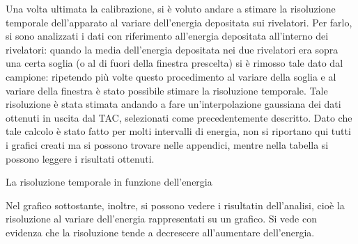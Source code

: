 
Una volta ultimata la calibrazione, si è voluto andare a stimare la risoluzione temporale dell'apparato al variare dell'energia depositata sui
rivelatori. Per farlo, si sono analizzati i dati con riferimento all'energia depositata all'interno dei rivelatori: quando la media dell'energia
depositata nei due rivelatori era sopra una certa soglia (o al di fuori della finestra prescelta) si è rimosso tale dato dal campione: ripetendo più
volte questo procedimento al variare della soglia e al variare della finestra è stato possibile stimare la risoluzione temporale. Tale
risoluzione è stata stimata andando a fare un'interpolazione gaussiana dei dati ottenuti in uscita dal TAC, selezionati come precedentemente descritto.
Dato che tale calcolo è stato fatto per molti intervalli di energia, non si riportano qui tutti i grafici creati ma si possono trovare nelle appendici,
mentre nella tabella si possono leggere i risultati ottenuti.
%
\begin{tabella}
	\centering
	
	\caption{La risoluzione temporale in funzione dell'energia}
	\label{tab:01tab1}
\end{tabella}
%
Nel grafico sottostante, inoltre, si possono vedere i risultatin dell'analisi, cioè la risoluzione al variare dell'energia rappresentati su un grafico. Si
vede con evidenza che la risoluzione tende a decrescere all'aumentare dell'energia.
\\
